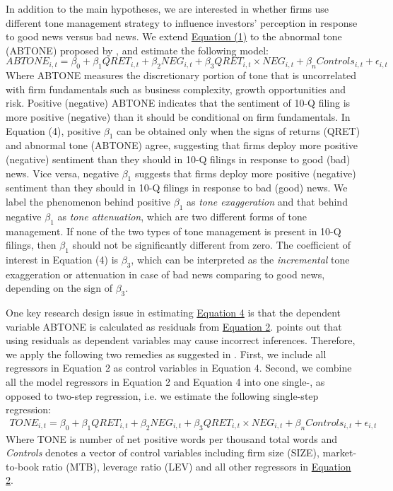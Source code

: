 \documentclass[a4paper]{article}
\begin{document}
\begin{spacing}{2}
In addition to the main hypotheses, we are interested in whether firms use different tone management strategy to influence investors' perception in response to good news versus bad news. We extend \hyperref[eq1]{Equation (1)} to the abnormal tone (ABTONE) proposed by \cite{huangToneManagement2014}, and estimate the following model:
\begin{equation} \label{eq4}
ABTONE_{i,t}=\beta_0+\beta_1QRET_{i,t}+\beta_2NEG_{i,t}+\beta_3QRET_{i,t}\times NEG_{i,t}+\beta_nControls_{i,t}+\epsilon_{i,t}
\end{equation}
Where ABTONE measures the discretionary portion of tone that is uncorrelated with firm fundamentals such as business complexity, growth opportunities and risk. Positive (negative) ABTONE indicates that the sentiment of 10-Q filing is more positive (negative) than it should be conditional on firm fundamentals. In Equation (4), positive $\beta_1$ can be obtained only when the signs of returns (QRET) and abnormal tone (ABTONE) agree, suggesting that firms deploy more positive (negative) sentiment than they should in 10-Q filings in response to good (bad) news. Vice versa, negative $\beta_1$ suggests that firms deploy more positive (negative) sentiment than they should in 10-Q filings in response to bad (good) news. We label the phenomenon behind positive $\beta_1$ as \textit{tone exaggeration} and that behind negative $\beta_1$ as \textit{tone attenuation}, which are two different forms of tone management. If none of the two types of tone management is present in 10-Q filings, then $\beta_1$ should not be significantly different from zero. The coefficient of interest in Equation (4) is $\beta_3$, which can be interpreted as the \textit{incremental} tone exaggeration or attenuation in case of bad news comparing to good news, depending on the sign of $\beta_3$.

One key research design issue in estimating \hyperref[eq4]{Equation 4} is that the dependent variable ABTONE is calculated as residuals from \hyperref[eq2]{Equation 2}. \cite{chenIncorrectInferencesWhen2018} points out that using residuals as dependent variables may cause incorrect inferences. Therefore, we apply the following two remedies as suggested in \cite{chenIncorrectInferencesWhen2018}. First, we include all regressors in Equation 2 as control variables in Equation 4. Second, we combine all the model regressors in Equation 2 and Equation 4 into one single-, as opposed to two-step regression, i.e. we estimate the following single-step regression:
\begin{equation} \label{eq5}
\begin{split}
TONE_{i,t}=\beta_0+\beta_1QRET_{i,t}+\beta_2NEG_{i,t}+\beta_3QRET_{i,t}\times NEG_{i,t}+\beta_nControls_{i,t}+\epsilon_{i,t}
\end{split}
\end{equation}
Where TONE is number of net positive words per thousand total words and \textit{Controls} denotes a vector of control variables including firm size (SIZE), market-to-book ratio (MTB), leverage ratio (LEV) and all other regressors in \hyperref[eq2]{Equation 2}.


\end{spacing}
\end{document}
